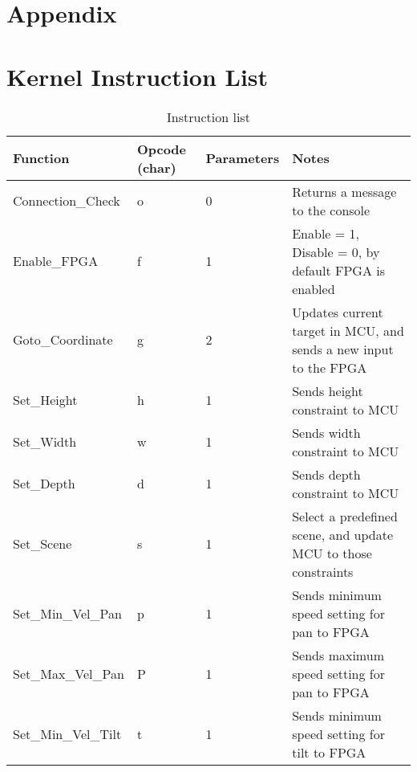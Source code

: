 \section{Appendix}

\appendix
\section{Kernel Instruction List}
\label{sec:KernelInstructionList}

\begin{table}[]
	\centering
	\caption{Instruction list}
	\label{InstructionList}


    \begin{tabular}{ | l | l | l | p{5cm} |}
    \hline
    Function &  Opcode (char) & Parameters & Notes \\ 
    \hline
    
    Connection\_Check & o & 0 & Returns a message to the console \\
    \hline
    
    Enable\_FPGA & f & 1 & Enable = 1, Disable = 0, by default FPGA is enabled \\
    \hline
    
     Goto\_Coordinate & g & 2 & Updates current target in MCU, and sends a new input to    		the FPGA  \\
    \hline
    
    Set\_Height & h & 1 & Sends height constraint to MCU \\
    \hline

    Set\_Width & w & 1 & Sends width constraint to MCU \\
    \hline
    
    Set\_Depth & d & 1 & Sends depth constraint to MCU \\
    \hline
    
     Set\_Scene & s & 1 & Select a predefined scene, and update MCU to those constraints \\
    \hline
    
     Set\_Min\_Vel\_Pan & p & 1 & Sends minimum speed setting for pan to FPGA \\
    \hline
    
     Set\_Max\_Vel\_Pan & P & 1 & Sends maximum speed setting for pan to FPGA \\
    \hline
    
     Set\_Min\_Vel\_Tilt & t & 1 & Sends minimum speed setting for tilt to FPGA \\
    \hline
    

\end{tabular}
\end{table}
